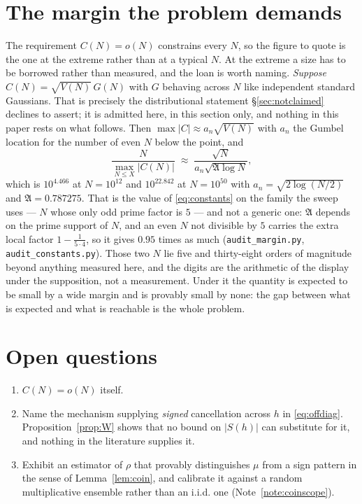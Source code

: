 \documentclass[11pt,a4paper]{article}
\theoremstyle{plain}
\theoremstyle{definition}
\theoremstyle{remark}
\newcommand{\AAA}{\mathfrak{A}}
\begin{document}
\section{The margin the problem demands}\label{sec:margin}

The requirement $C(N)=o(N)$ constrains every $N$, so the figure to
quote is the one at the extreme rather than at a typical $N$. At the
extreme a size has to be borrowed rather than measured, and the loan
is worth naming. \emph{Suppose} $C(N)=\sqrt{V(N)}\,G(N)$ with $G$
behaving across $N$ like independent standard Gaussians. That is
precisely the distributional statement \S\ref{sec:notclaimed} declines
to assert; it is admitted here, in this section only, and nothing in
this paper rests on what follows. Then
$\max|C|\approx a_n\sqrt{V(N)}$ with $a_n$ the Gumbel location for the
number of even $N$ below the point, and
\[
  \frac{N}{\max_{N\le X}|C(N)|}\;\approx\;
  \frac{\sqrt N}{a_n\sqrt{\AAA\log N}},
\]
which is $10^{4.466}$ at $N=10^{12}$ and $10^{22.842}$ at $N=10^{50}$
with $a_n=\sqrt{2\log(N/2)}$ and $\AAA=0.787275$. That is the value of
\eqref{eq:constants} on the family the sweep uses --- $N$ whose only
odd prime factor is $5$ --- and not a generic one: $\AAA$ depends on
the prime support of $N$, and an even $N$ not divisible by $5$ carries
the extra local factor $1-\frac{1}{5\cdot4}$, so it gives
$0.95$ times as much
(\texttt{audit\_margin.py}, \texttt{audit\_constants.py}). Those two
$N$ lie five and thirty-eight orders of magnitude beyond anything
measured here, and the digits are the arithmetic of the display under
the supposition, not a measurement. Under it the quantity is
expected to be small by a wide margin and is provably
small by none: the gap between what is expected and what is reachable
is the whole problem.

\section{Open questions}

\begin{enumerate}
\item $C(N)=o(N)$ itself.
\item Name the mechanism supplying \emph{signed} cancellation across
$h$ in \eqref{eq:offdiag}. Proposition~\ref{prop:W} shows that no
bound on $|S(h)|$ can substitute for it, and nothing in the literature
supplies it.
\item Exhibit an estimator of $\rho$ that provably distinguishes $\mu$
from a sign pattern in the sense of Lemma~\ref{lem:coin}, and
calibrate it against a random multiplicative ensemble rather than an
i.i.d. one (Note~\ref{note:coinscope}).
\end{enumerate}
\end{document}
